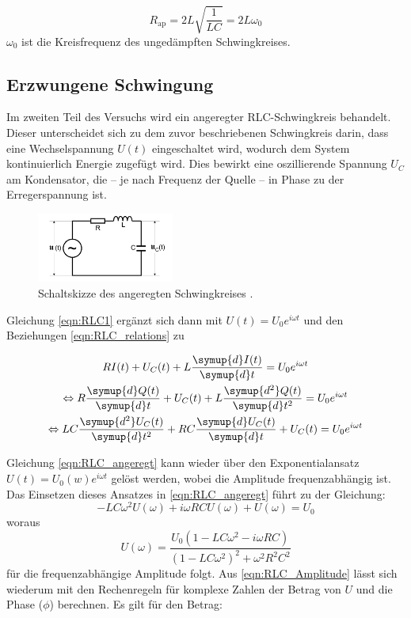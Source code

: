 \begin{equation}
    \label{eqn:R_ap}
    R_\text{ap} =2L \sqrt{\frac{1}{LC}} = 2L \omega_0
\end{equation}
$\omega_0$ ist die Kreisfrequenz des ungedämpften Schwingkreises.



\subsection{Erzwungene Schwingung}
\label{sec:Theorie_2}

Im zweiten Teil des Versuchs wird ein angeregter RLC-Schwingkreis behandelt. Dieser unterscheidet sich zu dem zuvor
beschriebenen Schwingkreis darin, dass eine Wechselspannung $U(t)$ eingeschaltet wird, wodurch dem System kontinuierlich Energie
zugefügt wird. Dies bewirkt eine oszillierende Spannung $U_C$ am Kondensator, die -- je nach Frequenz der Quelle -- in Phase zu der Erregerspannung ist.

\begin{figure}
	\centering
    \includegraphics[width=0.4\textwidth]{content/RLC_angeregt.pdf}
	\caption{Schaltskizze des angeregten Schwingkreises \cite{v354}.}
	\label{fig:RLC_angeregt}
\end{figure}

Gleichung \eqref{eqn:RLC1} ergänzt sich dann mit $U(t) = U_0e^{i\omega t}$ und den Beziehungen \eqref{eqn:RLC_relations} zu

\begin{gather}  
    R I(t) + U_C(t) + L \frac{\symup{d}I(t)}{\symup{d}t} = U_0e^{i\omega t} \nonumber \\
    \Leftrightarrow R \frac{\symup{d}Q(t)}{\symup{d}t} + U_C(t)    + L \frac{\symup{d^2}Q(t)}{\symup{d}t^2} = U_0e^{i\omega t} \nonumber \\
    \Leftrightarrow LC \frac{\symup{d^2}U_C(t)}{\symup{d}t^2} + RC \frac{\symup{d}U_C(t)}{\symup{d}t} + U_C(t) = U_0e^{i\omega t}
    \label{eqn:RLC_angeregt}
\end{gather}

Gleichung \eqref{eqn:RLC_angeregt} kann wieder über den Exponentialansatz $U(t) = U_0(w)e^{i\omega t}$ gelöst werden,
wobei die Amplitude frequenzabhängig ist. Das Einsetzen dieses Ansatzes in \eqref{eqn:RLC_angeregt} führt zu der Gleichung:
\begin{equation*}
    -LC\omega^2 U(\omega) + i\omega RC U(\omega) + U(\omega) = U_0
\end{equation*}
woraus 
\begin{equation}
    \label{eqn:RLC_Amplitude}
    U(\omega) = \frac{U_0 (1-LC\omega^2-i\omega RC)}{(1-LC\omega^2)^2+\omega^2 R^2 C^2}
\end{equation}
für die frequenzabhängige Amplitude folgt. Aus \eqref{eqn:RLC_Amplitude} lässt sich wiederum mit den Rechenregeln für
komplexe Zahlen der Betrag von $U$ und die Phase ($\phi$) berechnen. Es gilt für den Betrag:

